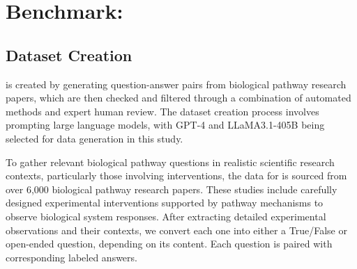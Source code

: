 \section{Benchmark: \benchname}


\subsection{Dataset Creation}

\benchname is created by generating question-answer pairs from biological pathway research papers, which are then checked and filtered through a combination of automated methods and expert human review. The dataset creation process involves prompting large language models, with GPT-4 and LLaMA3.1-405B \citep{dubey2024llama} being selected for data generation in this study.

To gather relevant biological pathway questions in realistic scientific research contexts, particularly those involving interventions, the data for \benchname is sourced from over 6,000 biological pathway research papers. These studies include carefully designed experimental interventions supported by pathway mechanisms to observe biological system responses. After extracting detailed experimental observations and their contexts, we convert each one into either a True/False or open-ended question, depending on its content. Each question is paired with corresponding labeled answers.




